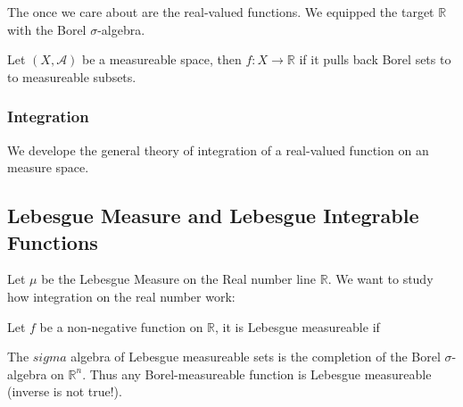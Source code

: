 \documentclass[main.tex]{subfiles}
\begin{document}
The once we care about are the real-valued functions. We equipped the target $\mathbb{R}$ with the Borel $\sigma$-algebra. 

\begin{definition}
Let $(X, \mathcal{A})$ be a measureable space, then $f : X \rightarrow \mathbb{R}$ if it pulls back Borel sets to to measureable subsets.
\end{definition}


\subsubsection{Integration}

We develope the general theory of integration of a real-valued function on an measure space. 



\subsection{Lebesgue Measure and Lebesgue Integrable Functions}



Let $\mu$ be the Lebesgue Measure on the Real number line $\mathbb{R}$. We want to study how integration on the real number work:

\begin{definition}
Let $f$ be a non-negative function on $\mathbb{R}$, it is Lebesgue measureable if 
\end{definition}





\begin{remark}
The $sigma$ algebra of Lebesgue measureable sets is the completion of the Borel $\sigma$-algebra on $\mathbb{R}^n$. Thus any Borel-measureable function is Lebesgue measureable (inverse is not true!).
\end{remark}
\end{document}
